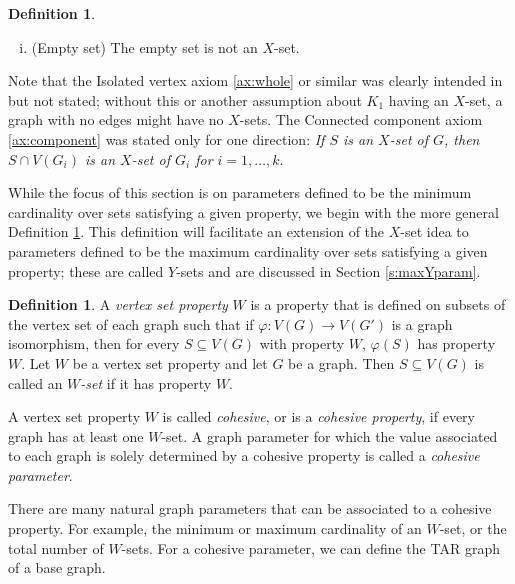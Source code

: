 \documentclass{article}
\numberwithin{figure}{section}
\numberwithin{table}{section}
\numberwithin{equation}{section}
\theoremstyle{definition}
\theoremstyle{definition}
\newtheorem{defn}[thm]{Definition}
\theoremstyle{definition}
\begin{document}
{\begin{defn}
\begin{enumerate}[(i)]
\item\label{ax:empty} (Empty set) The empty set is not an $X$-set.
\end{enumerate}
\end{defn}


 
Note that the Isolated vertex axiom \eqref{ax:whole} or similar was clearly intended in \cite{PDrecon, XTARiso} but not stated; without this or another assumption about $K_1$ having an $X$-set, a graph with no edges might have no $X$-sets. 
 The Connected component axiom \eqref{ax:component} was stated only for one direction: {\em If $S$ is an $X$-set of $G$, then $S\cap V(G_i)$ is an $X$-set of $G_i$ for $i=1,\dots,k$}.




 While the focus of this section is on parameters defined to be the minimum cardinality over sets satisfying a given property, we begin with the more general Definition \ref{def:vert set prop}. This definition will facilitate an extension of the $X$-set idea to parameters defined to be the maximum cardinality over sets satisfying a given property; these are called $Y$-sets and are discussed in Section \ref{s:maxYparam}.






 \begin{defn}\label{def:vert set prop}
A \emph{vertex set property} $W$ is a property that is defined on subsets of the vertex set of each graph such that if $\varphi: V(G) \to V(G')$ is a graph isomorphism, then for every $S\subseteq V(G)$ with property $W$, $\varphi(S)$ has property $W$. Let $W$ be a vertex set property and let $G$ be a graph. Then $S\subseteq V(G)$ is called an \emph{$W$-set} if it has property $W$.  

A vertex set property $W$ is called  \emph{cohesive}, or is a \emph{cohesive 
property}, if every graph has at least one $W$-set.  
A  graph parameter for which the value associated to each graph is solely determined by a cohesive property is called a \emph{cohesive parameter}.
\end{defn}




There are many natural graph parameters that can be associated to a cohesive  property. For example, the minimum or maximum cardinality of an $W$-set, or the total number of $W$-sets.  For a cohesive parameter, we can define the TAR graph  of a base graph.

}
\end{document}
